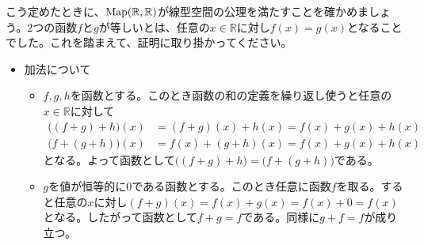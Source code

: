 こう定めたときに、$\operatorname{Map}(\mathbb{R}, \mathbb{R})$が線型空間の公理を満たすことを確かめましょう。$2$つの函数$f$と$g$が等しいとは、任意の$x\in\mathbb{R}$に対し$f(x) = g(x)$となることでした。これを踏まえて、証明に取り掛かってください。
\begin{itemize}
\item 加法について
\begin{itemize}
\item $f, g, h$を函数とする。このとき函数の和の定義を繰り返し使うと任意の$x\in\mathbb{R}$に対して
\begin{align*}
\bigl((f + g) + h\bigr)(x) &= (f + g)(x) + h(x) = f(x) + g(x) + h(x) \\
\bigl(f + (g + h)\bigr)(x) &= f(x) + (g + h)(x) = f(x) + g(x) + h(x)
\end{align*}
となる。よって函数として$\bigl((f + g) + h\bigr) = \bigl(f + (g + h)\bigr)$である。
\item $g$を値が恒等的に$0$である函数とする。このとき任意に函数$f$を取る。すると任意の$x$に対し$(f + g)(x) = f(x) + g(x) = f(x) + 0 = f(x)$となる。したがって函数として$f + g = f$である。同様に$g + f = f$が成り立つ。


\end{itemize}
\end{itemize}
